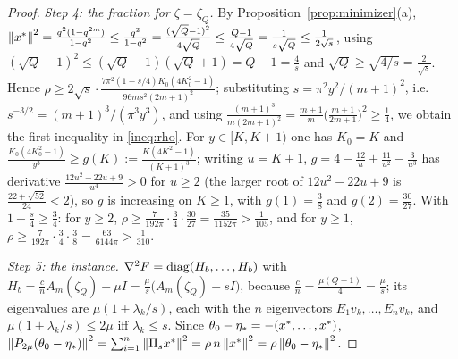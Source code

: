 \begin{proof}
\emph{Step 4: the fraction for $\zeta=\zeta_Q$.} By Proposition~\ref{prop:minimizer}(a), $\left\|x^\ast\right\|^2=\frac{q^2(1-q^{2m})}{1-q^2}\le\frac{q^2}{1-q^2}=\frac{(\sqrt Q-1)^2}{4\sqrt Q}\le\frac{Q-1}{4\sqrt Q}=\frac1{s\sqrt Q}\le\frac1{2\sqrt s}$, using $(\sqrt Q-1)^2\le(\sqrt Q-1)(\sqrt Q+1)=Q-1=\frac4s$ and $\sqrt Q\ge\sqrt{4/s}=\frac2{\sqrt s}$. Hence $\rho\ge2\sqrt s\cdot\frac{7\pi^2(1-s/4)K_0(4K_0^2-1)}{96ms^2(2m+1)^2}$; substituting $s=\pi^2y^2/(m+1)^2$, i.e.\ $s^{-3/2}=(m+1)^3/(\pi^3y^3)$, and using $\frac{(m+1)^3}{m(2m+1)^2}=\frac{m+1}m\big(\frac{m+1}{2m+1}\big)^2\ge\frac14$, we obtain the first inequality in \eqref{ineq:rho}. For $y\in[K,K+1)$ one has $K_0=K$ and $\frac{K_0(4K_0^2-1)}{y^3}\ge g(K):=\frac{K(4K^2-1)}{(K+1)^3}$; writing $u=K+1$, $g=4-\frac{12}u+\frac{11}{u^2}-\frac3{u^3}$ has derivative $\frac{12u^2-22u+9}{u^4}>0$ for $u\ge2$ (the larger root of $12u^2-22u+9$ is $\frac{22+\sqrt{52}}{24}<2$), so $g$ is increasing on $K\ge1$, with $g(1)=\frac38$ and $g(2)=\frac{30}{27}$. With $1-\frac s4\ge\frac34$: for $y\ge2$, $\rho\ge\frac7{192\pi}\cdot\frac34\cdot\frac{30}{27}=\frac{35}{1152\pi}>\frac1{105}$, and for $y\ge1$, $\rho\ge\frac7{192\pi}\cdot\frac34\cdot\frac38=\frac{63}{6144\pi}>\frac1{310}$.

\emph{Step 5: the instance.} $\nabla^2F=\operatorname{diag}(H_b,\dots,H_b)$ with $H_b=\frac cnA_m(\zeta_Q)+\mu I=\frac\mu s\big(A_m(\zeta_Q)+sI\big)$, because $\frac cn=\frac{\mu(Q-1)}4=\frac\mu s$; its eigenvalues are $\mu(1+\lambda_k/s)$, each with the $n$ eigenvectors $E_1v_k,\dots,E_nv_k$, and $\mu(1+\lambda_k/s)\le2\mu$ iff $\lambda_k\le s$. Since $\theta_0-\eta_\ast=-(x^\ast,\dots,x^\ast)$, $\left\|P_{2\mu}(\theta_0-\eta_\ast)\right\|^2=\sum_{i=1}^n\left\|\Pi_sx^\ast\right\|^2=\rho\,n\left\|x^\ast\right\|^2=\rho\left\|\theta_0-\eta_\ast\right\|^2$.
\end{proof}

